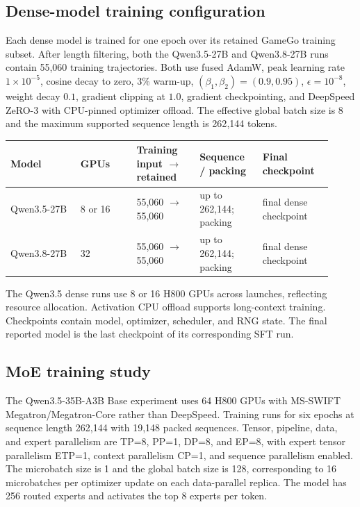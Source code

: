 \documentclass{article}
\begin{document}
\subsection{Dense-model training configuration}
\label{app:dense_training}

Each dense model is trained for one epoch over its retained GameGo training subset. After length filtering, both the Qwen3.5-27B and Qwen3.8-27B runs contain 55{,}060 training trajectories. Both use fused AdamW, peak learning rate $1\times10^{-5}$, cosine decay to zero, 3\% warm-up, $(\beta_1,\beta_2)=(0.9,0.95)$, $\epsilon=10^{-8}$, weight decay $0.1$, gradient clipping at $1.0$, gradient checkpointing, and DeepSpeed ZeRO-3 with CPU-pinned optimizer offload. The effective global batch size is 8 and the maximum supported sequence length is 262{,}144 tokens.

\begin{center}
\scriptsize
\setlength{\tabcolsep}{0pt}
\begin{tabular}{@{}p{0.20\linewidth}p{0.16\linewidth}p{0.18\linewidth}p{0.18\linewidth}p{0.20\linewidth}@{}}
\toprule
Model & GPUs & Training input $\rightarrow$ retained & Sequence / packing & Final checkpoint \\
\midrule
Qwen3.5-27B & 8 or 16 & 55,060 $\rightarrow$ 55,060 & up to 262,144; packing & final dense checkpoint \\
Qwen3.8-27B & 32 & 55,060 $\rightarrow$ 55,060 & up to 262,144; packing & final dense checkpoint \\
\bottomrule
\end{tabular}
\end{center}

The Qwen3.5 dense runs use 8 or 16 H800 GPUs across launches, reflecting resource allocation. Activation CPU offload supports long-context training. Checkpoints contain model, optimizer, scheduler, and RNG state. The final reported model is the last checkpoint of its corresponding SFT run.

\subsection{MoE training study}
\label{app:moe_training}

The Qwen3.5-35B-A3B Base experiment uses 64 H800 GPUs with MS-SWIFT Megatron/Megatron-Core rather than DeepSpeed. Training runs for six epochs at sequence length 262,144 with 19,148 packed sequences. Tensor, pipeline, data, and expert parallelism are TP=8, PP=1, DP=8, and EP=8, with expert tensor parallelism ETP=1, context parallelism CP=1, and sequence parallelism enabled. The microbatch size is 1 and the global batch size is 128, corresponding to 16 microbatches per optimizer update on each data-parallel replica. The model has 256 routed experts and activates the top 8 experts per token.
\end{document}
